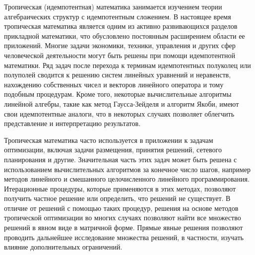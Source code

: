\documentclass[specialist,
               substylefile = spbu.rtx,
               subf,href,colorlinks=true, 12pt]{disser}
\theoremstyle{definition}
\begin{document}
Тропическая (идемпотентная) математика занимается изучением теории алгебраических структур с идемпотентным сложением. %
В настоящее время тропическая математика является одним из активно развивающихся разделов прикладной математики, что обусловлено постоянным расширением области ее приложений. Многие задачи экономики, техники, управления и других сфер человеческой деятельности могут быть решены при помощи идемпотентной математики.
Ряд задач после перехода к терминам идемпотентных полуколец или полуполей сводится к решению систем линейных уравнений и неравенств, нахождению собственных чисел и векторов линейного оператора и тому подобным процедурам. 
Кроме того, некоторые вычислительные алгоритмы линейной алгебры, такие как метод Гаусса-Зейделя и алгоритм Якоби, имеют свои идемпотентные аналоги, что в некоторых случаях позволяет облегчить представление и интерпретацию результатов.


%
Тропическая математика часто используется в приложении к задачам оптимизации, включая задачи размещения, принятия решений, сетевого планирования и другие. Значительная часть этих задач может быть решена с использованием вычислительных алгоритмов за конечное число шагов, например методов  линейного и смешанного целочисленного линейного программирования. 
Итерационные процедуры, которые применяются в этих методах, позволяют получить частное решение или определить, что решений не существует. 
В отличие от решений с помощью таких процедур, решения на основе методов тропической оптимизации во многих случаях 
%
позволяют найти все множество решений в явном виде в матричной форме.  %
Прямые явные решения позволяют проводить дальнейшее исследование множества решений, в частности, изучать влияние дополнительных ограничений.%
\end{document}
